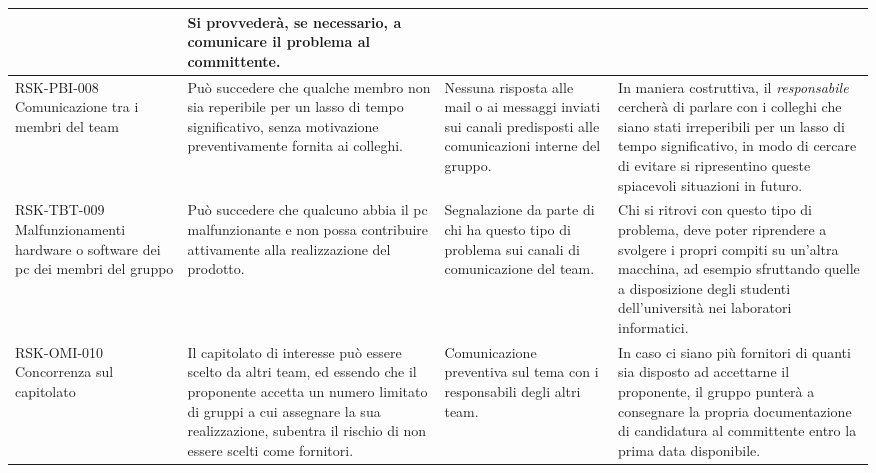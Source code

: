 \begin{center}
\begin{longtable}{|p{3cm}|p{4cm}|p{3.5cm}|p{3.5cm}|}
	& Si provvederà, se necessario, a comunicare il problema al committente.  \\
	\hline
	
		\hline
	RSK-PBI-008 \newline Comunicazione tra i membri del team
	 & 
	Può succedere che qualche membro non sia reperibile per un lasso di tempo significativo, senza motivazione preventivamente fornita ai colleghi.
	&   

	Nessuna risposta alle mail o ai messaggi inviati sui canali predisposti alle comunicazioni interne del gruppo.
	 
	& In maniera costruttiva, il \textit{responsabile}
	   cercherà di parlare con i colleghi che siano stati irreperibili per un lasso di tempo significativo, in modo di cercare di evitare si ripresentino queste spiacevoli situazioni in futuro. \\
	\hline
	
			\hline
	RSK-TBT-009 \newline Malfunzionamenti hardware o software dei pc dei membri del gruppo
	 & 
	Può succedere che qualcuno abbia il pc malfunzionante e non possa contribuire attivamente alla realizzazione del prodotto.
	&   

	Segnalazione da parte di chi ha questo tipo di problema sui canali di comunicazione del team.
	 
	& Chi si ritrovi con questo tipo di problema, deve poter riprendere a svolgere i propri compiti su un'altra macchina, ad esempio sfruttando quelle a disposizione degli studenti dell'università nei laboratori informatici. \\
	\hline
	
	
				\hline
	RSK-OMI-010 \newline Concorrenza sul capitolato
	 & 
	Il capitolato di interesse può essere scelto da altri team, ed essendo che il proponente accetta un numero limitato di gruppi a cui assegnare la sua realizzazione, subentra il rischio di non essere scelti come fornitori.
	&   

	Comunicazione preventiva sul tema con i responsabili degli altri team.
	 
	& In caso ci siano più fornitori di quanti sia disposto ad accettarne il proponente, il gruppo punterà a consegnare la propria documentazione di candidatura al committente entro la prima data disponibile. \\
	\hline
	
	
	\end{longtable}
\end{center}